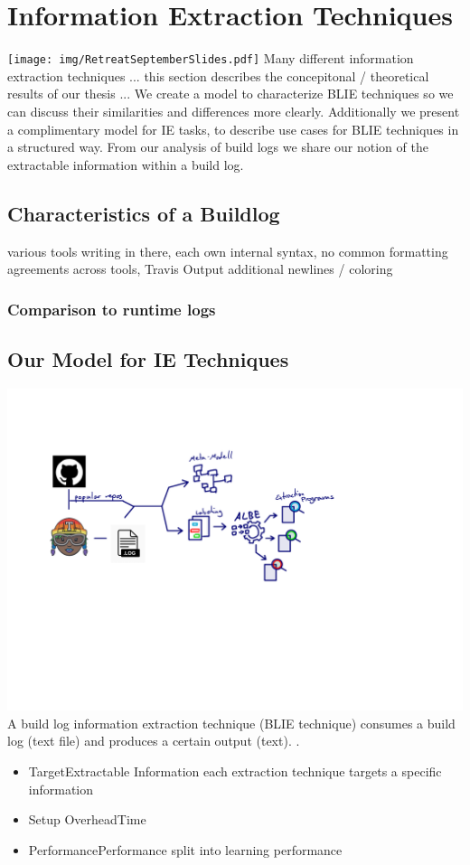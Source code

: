 \documentclass[\myrootdir/main.tex]{subfiles}
\begin{document}
\chapter{Information Extraction Techniques}
\label{models}
\texttt{[image: img/RetreatSeptemberSlides.pdf]}
Many different information extraction techniques ... this section describes the concepitonal / theoretical results of our thesis ... 
We create a model to characterize BLIE techniques so we can discuss their similarities and differences more clearly. 
Additionally we present a complimentary model for IE tasks, to describe use cases for BLIE techniques in a structured way.
From our analysis of build logs we share our notion of the extractable information within a build log.

\section{Characteristics of a Buildlog}
various tools writing in there, each own internal syntax, no common formatting agreements across tools, Travis Output additional newlines / coloring

\subsection{Comparison to runtime logs}

\section{Our Model for IE Techniques}
\includegraphics[page=3, width=\textwidth, trim={0.5cm 0.5cm 0.5cm 0.5cm}, clip]{img/flow-of-research.pdf}
A build log information extraction technique (BLIE technique) consumes a build log (text file) and produces a certain output (text). .
\begin{itemize}
  \item{Target}{Extractable Information} each extraction technique  targets a specific information
  \item{Setup Overhead}{Time}
  \item{Performance}{Performance} split into learning performance
\end{itemize}
\end{document}
